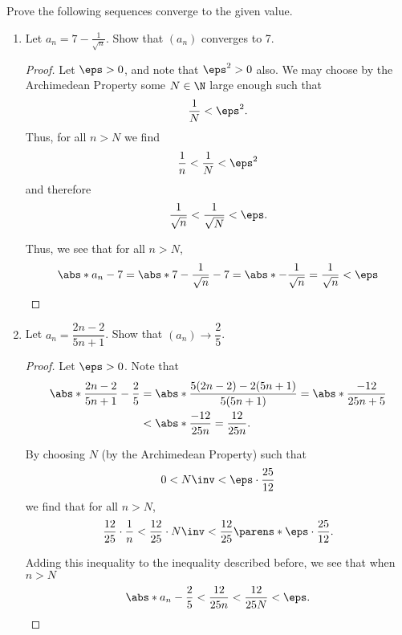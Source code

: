   \item Prove the following sequences converge to the given value.
        \begin{enumerate}
          \item Let $a_{n} = 7 - \frac{1}{\sqrt{n}}$. Show that $(a_{n})$ converges to 7.
                \begin{proof}
                  Let $\eps > 0$, and note that $\eps^{2} > 0$ also. We may choose by the Archimedean Property some $N \in \N$
                  large enough such that
                  \[
                    \frac{1}{N} < \eps^{2}.
                  \]
                  Thus, for all $n > N$ we find
                  \[
                    \frac{1}{n} < \frac{1}{N} < \eps^{2}
                  \]
                  and therefore
                  \[
                    \frac{1}{\sqrt{n}} < \frac{1}{\sqrt{N}} < \eps.
                  \]

                  Thus, we see that for all $n > N$,
                  \[
                    \abs*{a_{n} - 7} = \abs*{7 - \frac{1}{\sqrt{n}} - 7} = \abs*{-\frac{1}{\sqrt{n}}} = \frac{1}{\sqrt{n}} < \eps
                  \]
                \end{proof}


          \item Let $a_{n} = \dfrac{2n - 2}{5n + 1}$. Show that $(a_{n}) \to \dfrac{2}{5}$.
                \begin{proof}
                  Let $\eps > 0$. Note that
                  \begin{align*}
                    \abs*{\frac{2n-2}{5n+1} - \frac{2}{5}} &= \abs*{\frac{5(2n-2) - 2(5n + 1)}{5(5n + 1)}} = \abs*{\frac{-12}{25n + 5}}\\
                    &< \abs*{\frac{-12}{25n}} = \frac{12}{25n}.
                  \end{align*}

                  By choosing $N$ (by the Archimedean Property) such that
                  \[
                    0 < N\inv < \eps \cdot \frac{25}{12}
                  \]
                  we find that for all $n > N$,
                  \[
                    \frac{12}{25}\cdot \frac{1}{n} < \frac{12}{25} \cdot N\inv < \frac{12}{25}\parens*{\eps \cdot \frac{25}{12}}.
                  \]

                  Adding this inequality to the inequality described before, we see that when $n > N$
                  \[
                    \abs*{a_{n} - \frac{2}{5}} < \frac{12}{25n} < \frac{12}{25N} < \eps.
                  \]
                \end{proof}


\end{enumerate}
